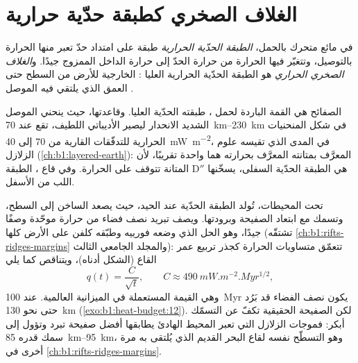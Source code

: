 \section{الغلاف الصخري كطبقة حدّية حرارية}\label{sec:b1:heat-budget:boundary-layer}

\begin{definition}\label{def:b1:heat-budget:boundary-layer}
في مائع متحرك بالحمل، \emph{الطبقة الحدّية الحرارية} طبقة على امتداد حدّ تعبر منها الحرارة بالتوصيل، وتتغيّر فيها الحرارة من حرارة الحدّ إلى حرارة الداخل الممزوج جيدًا. و\emph{الغلاف الصخري الحراري} هو الطبقة الحدّية الحرارية العليا :  الخارجية للأرض من السطح حتى العمق الذي يلتقي فيه  الموصل .
\end{definition}

الصفائح هي القمة الباردة لحمل ، طبقته الحدّية العليا. وقاعدتها، حيث ينحني  الموصل الشديد الانحدار ليصير الأديباتي اللطيف، تقع عند \qtyrange{70}{230}{km} في شكل المنحنيات الحرارية للتدفّقات القارية من 70 إلى \qty{40}{mW.m^{-2}}، في المدى الذي تقيسه علوم الزلازل (\cref{ch:b1:layered-earth}):  المعرَّف بمتانته  المعرَّف بحرارته هما  واحدة تقريبًا، لأن المتانة تتوقف على الحرارة. وفي قاع ، الطبقة D$''$ هي الطبقة الحدّية السفلى، يسخّنها اللب من الأسفل.

تحت المحيطات، تُولد الطبقة الحدّية عند الحيد، حيث يصعد  الساخن إلى السطح، وتسمك مع ابتعاد الصفيحة وبرودتها. ويصف تبريد نصف فضاء من حرارة موحّدة وصفًا جيدًا، وهو الحل الذي وضعه فورييه وطبّقه كلفن على الأرض كلها (تشتقّه \cref{ch:b1:rifts-ridges-margins} والمجلد الجامعي الثالث): تتعمّق متساويات الحرارة كجذر تربيع عمر القاع (الشكل أدناه)، ويتناقص  كما يلي
\[
  q(t) = \frac{C}{\sqrt t}, \qquad C \approx \qty{490}{mW.m^{-2}.Myr^{1/2}},
\]
وهي القيمة المستعملة في الميزانية العالمية. %
عند \qty{100}{Myr} يكون نصف الفضاء قد بَرُد حتى نحو \qty{130}{km} (\cref{exo:b1:heat-budget:12}). لكن الصفيحة الحقيقية تكفّ عن التسمّك أبكر: فموجات الزلازل التي تعبر المحيط الهادئ يطابقها أفضل صفيحة تبرد وتؤول إلى سمك قدره \qtyrange{85}{95}{km}، وهو التسطّح نفسه لقاع البحر القديم الذي يُلتقى به مرة أخرى في \cref{ch:b1:rifts-ridges-margins}.

